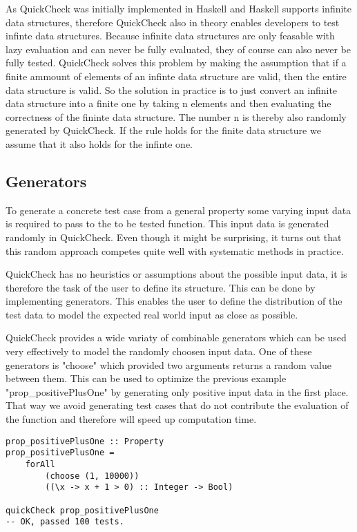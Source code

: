 \documentclass[a4paper, 12pt]{article} %
\begin{document}
As QuickCheck was initially implemented in Haskell and Haskell supports infinite data structures, therefore QuickCheck also in theory enables developers to test infinte data structures. Because infinite data structures are only feasable with lazy evaluation and can never be fully evaluated, they of course can also never be fully tested. QuickCheck solves this problem by making the assumption that if a finite ammount of elements of an infinte data structure are valid, then the entire data structure is valid. So the solution in practice is to just convert an infinite data structure into a finite one by taking n elements and then evaluating the correctness of the fininte data structure. The number n is thereby also randomly generated by QuickCheck. If the rule holds for the finite data structure we assume that it also holds for the infinte one. \cite{Claessen2000}

\subsection{Generators}

To generate a concrete test case from a general property some varying input data is required to pass to the to be tested function. This input data is generated randomly in QuickCheck. Even though it might be surprising, it turns out that this random approach competes quite well with systematic methods in practice. \cite{Claessen2000}

QuickCheck has no heuristics or assumptions about the possible input data, it is therefore the task of the user to define its structure. This can be done by implementing generators. This enables the user to define the distribution of the test data to model the expected real world input as close as possible.

QuickCheck provides a wide variaty of combinable generators which can be used very effectively to model the randomly choosen input data. One of these generators is "choose" which provided two arguments returns a random value between them. This can be used to optimize the previous example "prop_positivePlusOne" by generating only positive input data in the first place. That way we avoid generating test cases that do not contribute the evaluation of the function and therefore will speed up computation time. 

\begin{verbatim}
prop_positivePlusOne :: Property
prop_positivePlusOne = 
    forAll
        (choose (1, 10000))
        ((\x -> x + 1 > 0) :: Integer -> Bool)

quickCheck prop_positivePlusOne
-- OK, passed 100 tests.
\end{verbatim}
\end{document}
